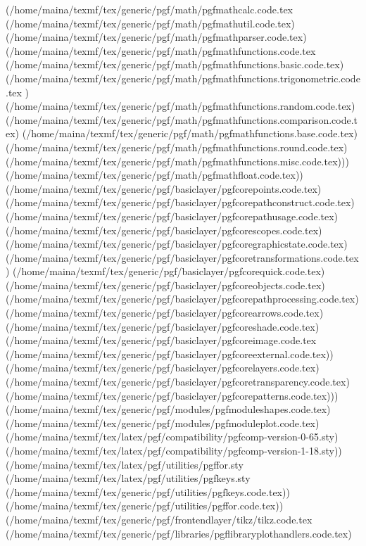 \begin{center}
\begin{center}
(/home/maina/texmf/tex/generic/pgf/math/pgfmathcalc.code.tex
(/home/maina/texmf/tex/generic/pgf/math/pgfmathutil.code.tex)
(/home/maina/texmf/tex/generic/pgf/math/pgfmathparser.code.tex)
(/home/maina/texmf/tex/generic/pgf/math/pgfmathfunctions.code.tex
(/home/maina/texmf/tex/generic/pgf/math/pgfmathfunctions.basic.code.tex)
(/home/maina/texmf/tex/generic/pgf/math/pgfmathfunctions.trigonometric.code.tex
) (/home/maina/texmf/tex/generic/pgf/math/pgfmathfunctions.random.code.tex)
(/home/maina/texmf/tex/generic/pgf/math/pgfmathfunctions.comparison.code.tex)
(/home/maina/texmf/tex/generic/pgf/math/pgfmathfunctions.base.code.tex)
(/home/maina/texmf/tex/generic/pgf/math/pgfmathfunctions.round.code.tex)
(/home/maina/texmf/tex/generic/pgf/math/pgfmathfunctions.misc.code.tex)))
(/home/maina/texmf/tex/generic/pgf/math/pgfmathfloat.code.tex))
(/home/maina/texmf/tex/generic/pgf/basiclayer/pgfcorepoints.code.tex)
(/home/maina/texmf/tex/generic/pgf/basiclayer/pgfcorepathconstruct.code.tex)
(/home/maina/texmf/tex/generic/pgf/basiclayer/pgfcorepathusage.code.tex)
(/home/maina/texmf/tex/generic/pgf/basiclayer/pgfcorescopes.code.tex)
(/home/maina/texmf/tex/generic/pgf/basiclayer/pgfcoregraphicstate.code.tex)
(/home/maina/texmf/tex/generic/pgf/basiclayer/pgfcoretransformations.code.tex)
(/home/maina/texmf/tex/generic/pgf/basiclayer/pgfcorequick.code.tex)
(/home/maina/texmf/tex/generic/pgf/basiclayer/pgfcoreobjects.code.tex)
(/home/maina/texmf/tex/generic/pgf/basiclayer/pgfcorepathprocessing.code.tex)
(/home/maina/texmf/tex/generic/pgf/basiclayer/pgfcorearrows.code.tex)
(/home/maina/texmf/tex/generic/pgf/basiclayer/pgfcoreshade.code.tex)
(/home/maina/texmf/tex/generic/pgf/basiclayer/pgfcoreimage.code.tex
(/home/maina/texmf/tex/generic/pgf/basiclayer/pgfcoreexternal.code.tex))
(/home/maina/texmf/tex/generic/pgf/basiclayer/pgfcorelayers.code.tex)
(/home/maina/texmf/tex/generic/pgf/basiclayer/pgfcoretransparency.code.tex)
(/home/maina/texmf/tex/generic/pgf/basiclayer/pgfcorepatterns.code.tex)))
(/home/maina/texmf/tex/generic/pgf/modules/pgfmoduleshapes.code.tex)
(/home/maina/texmf/tex/generic/pgf/modules/pgfmoduleplot.code.tex)
(/home/maina/texmf/tex/latex/pgf/compatibility/pgfcomp-version-0-65.sty)
(/home/maina/texmf/tex/latex/pgf/compatibility/pgfcomp-version-1-18.sty))
(/home/maina/texmf/tex/latex/pgf/utilities/pgffor.sty
(/home/maina/texmf/tex/latex/pgf/utilities/pgfkeys.sty
(/home/maina/texmf/tex/generic/pgf/utilities/pgfkeys.code.tex))
(/home/maina/texmf/tex/generic/pgf/utilities/pgffor.code.tex))
(/home/maina/texmf/tex/generic/pgf/frontendlayer/tikz/tikz.code.tex
(/home/maina/texmf/tex/generic/pgf/libraries/pgflibraryplothandlers.code.tex)

\end{center}
\end{center}
